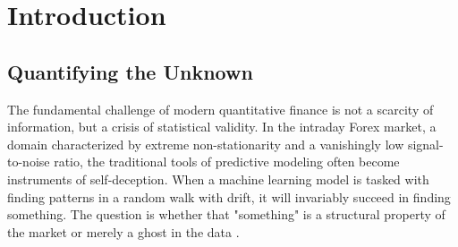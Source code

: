 \documentclass[12pt, a4paper]{article}
\begin{document}
\begin{abstract}
Overall, this thesis does not claim to have found a uniformly profitable Forex strategy, since the empirical record does not support that claim. 
It does show that a classifier-driven pipeline, built around statistical skepticism rather than raw predictive optimization, can concentrate a modest edge in a handful 
of pairs under an empirical conformal-style selective inference procedure whose calibration is evaluated out-of-sample. The procedure does not assert formal 
distribution-free validity in the strict exchangeable sense, an assumption that FX data manifestly violates, but rather serves as a disciplined heuristic for filtering signals 
against a historically conditioned mistake distribution. The results themselves illustrate the practical limits of this approach: four out of six architectures violate 
nominal coverage in the first fold, underscoring that this is a proof of concept for the meta-verification framework itself, rather than evidence of a deployable, 
general-purpose trading system. The contribution lies not in the profitability of any particular strategy, but in the transparency with which the pipeline reports and 
diagnoses its own failure modes.

\end{abstract}

\pagebreak

\tableofcontents

\pagebreak

\listoffigures

\pagebreak

\listoftables

\pagebreak

\setcounter{page}{1}

\section{Introduction}
\subsection{Quantifying the Unknown}

The fundamental challenge of modern quantitative finance is not a scarcity of information, but a crisis of statistical validity.
In the intraday Forex market, a domain characterized by extreme non-stationarity and a vanishingly low
signal-to-noise ratio, the traditional tools of predictive modeling often become instruments of self-deception.
When a machine learning model is tasked with finding patterns in a random walk with drift, it will invariably succeed in
finding something. The question is whether that "something" is a structural property of the market or merely a ghost in the data \parencite{xu2026causal}.
\end{document}
